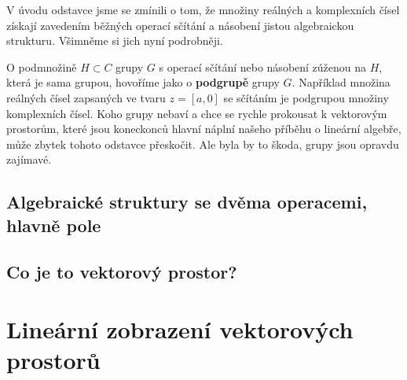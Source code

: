         
        
        V úvodu odstavce jsme se zmínili o tom, že množiny reálných a komplexních čísel získají 
        zavedením běžných operací sčítání a násobení jistou algebraickou strukturu. Všimněme si 
        jich nyní podrobněji. 
        
        
        
        
        
        O podmnožině \(H \subset C\) grupy \(G\) s operací sčítání nebo násobení zúženou na \(H\), 
        která je sama grupou, hovoříme jako o \textbf{podgrupě} grupy \(G\). Například množina 
        reálných čísel zapsaných ve tvaru \(z = [a, 0]\) se sčítáním je podgrupou množiny 
        komplexních čísel. Koho grupy nebaví a chce se rychle prokousat k vektorovým prostorům, 
        které jsou koneckonců hlavní náplní našeho příběhu o lineární algebře, může zbytek tohoto 
        odstavce přeskočit. Ale byla by to škoda, grupy jsou opravdu zajímavé.

        
        
        

        
        
      \subsection{Algebraické struktury se dvěma operacemi, hlavně pole}
      
      \subsection{Co je to vektorový prostor?}
  
  \section{Lineární zobrazení vektorových prostorů}

\printbibliography[title={Seznam literatury}, heading=subbibliography]
